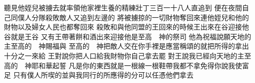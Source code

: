 聽見他姪兒被擄去\chientien 就率領他家裡生養的精練壯丁三百一十八人\chientien 直追到\yuentien 
{}便在夜間\chientien 自己同僕人分隊殺敗敵人\chientien 又追到左邊的\yuentien 
{}將被擄掠的一切財物奪回來\chientien 連他姪兒和他的財物\chientien 以及婦女人民\chientien 也都奪回來\chuan\Chuan
{}殺敗\chientien 和與他同盟的王回來的時候\chientien{}王出來\chientien 在谷迎接他\chientien{}谷就是{王}谷\chuan 
{}又有王\chientien 帶著餅和酒\chientien 出來迎接\yuentien 他是至高　神的祭司\chuan 
{}他為祝福\chientien 說\chientien 願天地的主\chientien 至高的　神\chientien 賜福與\yuentien 
{}至高的　神把敵人交在你手裡\chientien 是應當稱頌的\chuan{}就把所得的\chientien 拿出十分之一來\chientien 給\chuan 
{}王對說\chientien 你把人口給我\chientien 財物你自己拿去罷\chuan 
{}對王說\chientien 我已經向天地的主\chientien 至高的　神耶和華起誓\yuentien 
{}凡是你的東西\chientien 就是一根線\chientien 一根鞋帶\chientien 我都不拿\chientien 免得你說\chientien 我使富足\yuentien 
{}只有僕人所喫的\chientien 並與我同行的\chientien{}\chientien{}\chientien 所應得的分\chientien 可以任憑他們拿去\chuan
